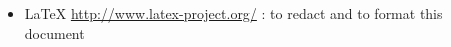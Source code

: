 \begin{itemize}
	\item LaTeX \url{http://www.latex-project.org/} : to redact and to format this document
\end{itemize}